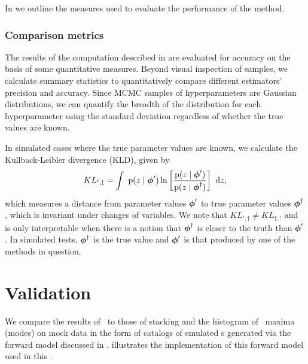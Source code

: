 In  we outline the measures used to evaluate the performance of the method.

\subsubsection{Comparison metrics}

The results of the computation described in  are evaluated for accuracy on the basis of some quantitative measures.  
Beyond visual inspection of samples, we calculate summary statistics to quantitatively compare different estimators' precision and accuracy.  
Since MCMC samples of hyperparameters are Gaussian distributions, we can quantify the breadth of the distribution for each hyperparameter using the standard deviation regardless of whether the true values are known.  

In simulated cases where the true parameter values are known, we calculate the Kullback-Leibler divergence (KLD), given by 
\begin{equation}
\eqlabel{eqn:kl}
KL_{',\ddagger} = \integral{\pr{z \gvn \ndphi'} \ln \left[ \frac{\pr{z \gvn \ndphi'}}{\pr{z \gvn \ndphi^{\dagger}}} \right]}{z} ,
\end{equation}
which measures a distance from parameter values ${\boldsymbol{\phi}}'$ to true parameter values ${\boldsymbol{\phi}}^{\dagger}$, which is invariant under changes of variables.  
We note that $KL_{',\dagger} \neq KL_{\dagger,'}$ and is only interpretable when there is a notion that ${\boldsymbol{\phi}}^{\dagger}$ is closer to the truth than ${\boldsymbol{\phi}}'$.
In simulated tests, ${\boldsymbol{\phi}}^{\dagger}$ is the true value and ${\boldsymbol{\phi}}'$ is that produced by one of the methods in question.

\section{Validation}

We compare the results of \Chippr\ to those of stacking and the histogram of \pzpdf\ maxima (modes) on mock data in the form of catalogs of emulated \pzpdf s generated via the forward model discussed in .
 illustrates the implementation of this forward model used in this \paper.

